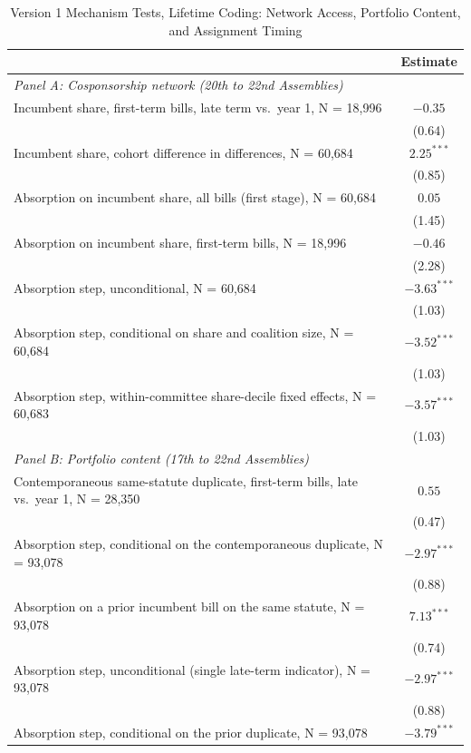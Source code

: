 \documentclass[11pt]{article}
\begin{document}
\begin{table}[H]
\centering
\singlespacing
\caption{Version 1 Mechanism Tests, Lifetime Coding: Network Access, Portfolio Content, and Assignment Timing}
\label{tab:mech}
\small
\begin{tabular}{lc}
\toprule
& Estimate \\
\midrule
\multicolumn{2}{l}{\textit{Panel A: Cosponsorship network (20th to 22nd Assemblies)}} \\
Incumbent share, first-term bills, late term vs.\ year 1, N = 18,996 & $-0.35$ \\
& (0.64) \\
Incumbent share, cohort difference in differences, N = 60,684 & $2.25^{***}$ \\
& (0.85) \\
Absorption on incumbent share, all bills (first stage), N = 60,684 & $0.05$ \\
& (1.45) \\
Absorption on incumbent share, first-term bills, N = 18,996 & $-0.46$ \\
& (2.28) \\
Absorption step, unconditional, N = 60,684 & $-3.63^{***}$ \\
& (1.03) \\
Absorption step, conditional on share and coalition size, N = 60,684 & $-3.52^{***}$ \\
& (1.03) \\
Absorption step, within-committee share-decile fixed effects, N = 60,683 & $-3.57^{***}$ \\
& (1.03) \\
\midrule
\multicolumn{2}{l}{\textit{Panel B: Portfolio content (17th to 22nd Assemblies)}} \\
Contemporaneous same-statute duplicate, first-term bills, late vs.\ year 1, N = 28,350 & $0.55$ \\
& (0.47) \\
Absorption step, conditional on the contemporaneous duplicate, N = 93,078 & $-2.97^{***}$ \\
& (0.88) \\
Absorption on a prior incumbent bill on the same statute, N = 93,078 & $7.13^{***}$ \\
& (0.74) \\
Absorption step, unconditional (single late-term indicator), N = 93,078 & $-2.97^{***}$ \\
& (0.88) \\
Absorption step, conditional on the prior duplicate, N = 93,078 & $-3.79^{***}$ \\

\end{tabular}
\end{table}
\end{document}
